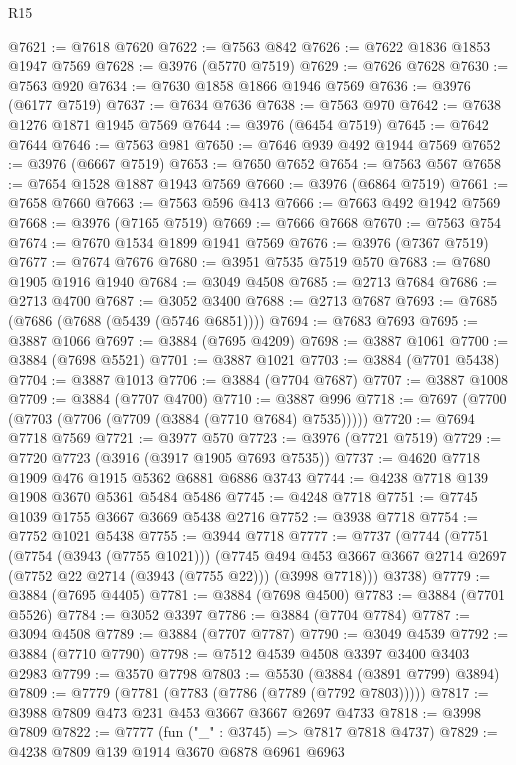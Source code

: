 \begin{lexlean}{R15}
\begin{coremodule}
@7621 := @7618 @7620
@7622 := @7563 @842
@7626 := @7622 @1836 @1853 @1947 @7569
@7628 := @3976 (@5770 @7519)
@7629 := @7626 @7628
@7630 := @7563 @920
@7634 := @7630 @1858 @1866 @1946 @7569
@7636 := @3976 (@6177 @7519)
@7637 := @7634 @7636
@7638 := @7563 @970
@7642 := @7638 @1276 @1871 @1945 @7569
@7644 := @3976 (@6454 @7519)
@7645 := @7642 @7644
@7646 := @7563 @981
@7650 := @7646 @939 @492 @1944 @7569
@7652 := @3976 (@6667 @7519)
@7653 := @7650 @7652
@7654 := @7563 @567
@7658 := @7654 @1528 @1887 @1943 @7569
@7660 := @3976 (@6864 @7519)
@7661 := @7658 @7660
@7663 := @7563 @596 @413
@7666 := @7663 @492 @1942 @7569
@7668 := @3976 (@7165 @7519)
@7669 := @7666 @7668
@7670 := @7563 @754
@7674 := @7670 @1534 @1899 @1941 @7569
@7676 := @3976 (@7367 @7519)
@7677 := @7674 @7676
@7680 := @3951 @7535 @7519 @570
@7683 := @7680 @1905 @1916 @1940
@7684 := @3049 @4508
@7685 := @2713 @7684
@7686 := @2713 @4700
@7687 := @3052 @3400
@7688 := @2713 @7687
@7693 := @7685 (@7686 (@7688 (@5439 (@5746 @6851))))
@7694 := @7683 @7693
@7695 := @3887 @1066
@7697 := @3884 (@7695 @4209)
@7698 := @3887 @1061
@7700 := @3884 (@7698 @5521)
@7701 := @3887 @1021
@7703 := @3884 (@7701 @5438)
@7704 := @3887 @1013
@7706 := @3884 (@7704 @7687)
@7707 := @3887 @1008
@7709 := @3884 (@7707 @4700)
@7710 := @3887 @996
@7718 := @7697 (@7700 (@7703 (@7706 (@7709 (@3884 (@7710 @7684) @7535)))))
@7720 := @7694 @7718 @7569
@7721 := @3977 @570
@7723 := @3976 (@7721 @7519)
@7729 := @7720 @7723 (@3916 (@3917 @1905 @7693 @7535))
@7737 := @4620 @7718 @1909 @476 @1915 @5362 @6881 @6886 @3743
@7744 := @4238 @7718 @139 @1908 @3670 @5361 @5484 @5486
@7745 := @4248 @7718
@7751 := @7745 @1039 @1755 @3667 @3669 @5438 @2716
@7752 := @3938 @7718
@7754 := @7752 @1021 @5438
@7755 := @3944 @7718
@7777 := @7737
    (@7744
      (@7751
        (@7754 (@3943 (@7755 @1021)))
        (@7745
          @494
          @453
          @3667
          @3667
          @2714
          @2697
          (@7752 @22 @2714 (@3943 (@7755 @22)))
          (@3998 @7718)))
      @3738)
@7779 := @3884 (@7695 @4405)
@7781 := @3884 (@7698 @4500)
@7783 := @3884 (@7701 @5526)
@7784 := @3052 @3397
@7786 := @3884 (@7704 @7784)
@7787 := @3094 @4508
@7789 := @3884 (@7707 @7787)
@7790 := @3049 @4539
@7792 := @3884 (@7710 @7790)
@7798 := @7512 @4539 @4508 @3397 @3400 @3403 @2983
@7799 := @3570 @7798
@7803 := @5530 (@3884 (@3891 @7799) @3894)
@7809 := @7779 (@7781 (@7783 (@7786 (@7789 (@7792 @7803)))))
@7817 := @3988 @7809 @473 @231 @453 @3667 @3667 @2697 @4733
@7818 := @3998 @7809
@7822 := @7777 (fun ("_" : @3745) => @7817 @7818 @4737)
@7829 := @4238 @7809 @139 @1914 @3670 @6878 @6961 @6963

\end{coremodule}
\end{lexlean}
